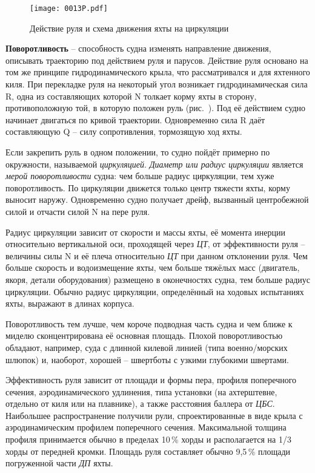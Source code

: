 \begin{figure*}[htb]
  \centering
  \texttt{[image: 0013P.pdf]}
  \caption{Действие руля и схема движения яхты на циркуляции}
  \label{fig:13}
\end{figure*}

\textbf{Поворотливость} \--- способность судна
изменять направление движения, описывать траекторию под действием руля
и парусов. Действие руля основано на том же принципе
гидродинамического крыла, что рассматривался и для яхтенного киля. При
перекладке руля на некоторый угол возникает гидродинамическая сила \ve
R, одна из составляющих которой \ve N толкает корму яхты в сторону,
противоположную той, в которую положен руль (рис.~). Под её
действием судно начинает двигаться по кривой траектории. Одновременно
сила \ve R даёт составляющую \ve Q \--- силу сопротивления, тормозящую
ход яхты.

Если закрепить руль в одном положении, то судно пойдёт примерно по
окружности, называемой \textit{циркуляцией}.  \textit{Диаметр или
радиус циркуляции} является \textit{мерой
поворотливости}
судна: чем больше радиус циркуляции, тем хуже поворотливость. По
циркуляции движется только центр тяжести яхты, корму выносит
наружу. Одновременно судно получает дрейф, вызванный центробежной
силой и отчасти силой \ve N на пере руля.

Радиус циркуляции зависит от скорости и массы яхты, её момента инерции
относительно вертикальной оси, проходящей через \textit{ЦТ}, от
эффективности руля \--- величины силы \ve N и её плеча относительно
\textit{ЦТ} при данном отклонении руля. Чем больше скорость и
водоизмещение яхты, чем больше тяжёлых масс (двигатель, якоря, детали
оборудования) размещено в оконечностях судна, тем больше радиус
циркуляции. Обычно радиус циркуляции, определённый на ходовых
испытаниях яхты, выражают в длинах корпуса.

Поворотливость тем лучше, чем короче подводная часть судна и чем ближе
к миделю сконцентрирована её основная площадь. Плохой поворотливостью
обладают, например, суда с длинной килевой линией (типа
военно\-/морских шлюпок) и, наоборот, хорошей \--- швертботы с узкими
глубокими швертами.

Эффективность руля зависит от площади и формы пера, профиля
поперечного сечения, аэродинамического удлинения, типа установки (на
ахтерштевне, отдельно от киля или на плавнике), а также расстояния
баллера от \textit{ЦБС}. Наибольшее распространение получили рули,
спроектированные в виде крыла с аэродинамическим профилем поперечного
сечения. Максимальной толщина профиля принимается обычно в пределах
10\,\% хорды и располагается на 1/3 хорды от передней
кромки. Площадь руля составляет обычно 9,5\,\% площади
погруженной части \textit{ДП} яхты.

